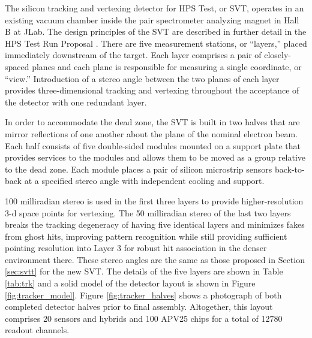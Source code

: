 The silicon tracking and vertexing detector for HPS Test, or SVT, operates in an existing vacuum chamber inside the pair spectrometer analyzing magnet in Hall B at JLab.  The design principles of the SVT are described in further detail in the HPS Test Run Proposal  \cite{HPS_tPROP}. There are five measurement stations, or ``layers,'' placed immediately downstream of the target. Each layer comprises a pair of closely-spaced planes and each plane is responsible for measuring a single coordinate, or ``view.'' Introduction of a stereo angle between the two planes of each layer provides three-dimensional tracking and vertexing throughout the acceptance of the detector with one redundant layer. 

In order to accommodate the dead zone, the SVT is built in two halves that are mirror reflections of one another about the plane of the nominal electron beam.  Each half consists of five double-sided modules mounted on a support plate that provides services to the modules and allows them to be moved as a group relative to the dead zone. Each module places a pair of silicon microstrip sensors back-to-back at a specified stereo angle with independent cooling and support.

100 milliradian stereo is used in the first three layers to provide higher-resolution 3-d space points for vertexing. The 50 milliradian stereo of the last two layers breaks the tracking degeneracy of having five identical layers and minimizes fakes from ghost hits, improving pattern recognition while still providing sufficient pointing resolution into Layer 3 for robust hit association in the denser environment there. These stereo angles are the same as those proposed in Section \ref{sec:svtt} for the new SVT. The details of the five layers are shown in Table \ref{tab:trk} and a solid model of the detector layout is shown in Figure \ref{fig:tracker_model}.  Figure \ref{fig:tracker_halves} shows a photograph of both completed detector halves prior to final assembly.  Altogether, this layout comprises 20 sensors and hybrids and 100 APV25 chips for a total of 12780 readout channels. 

